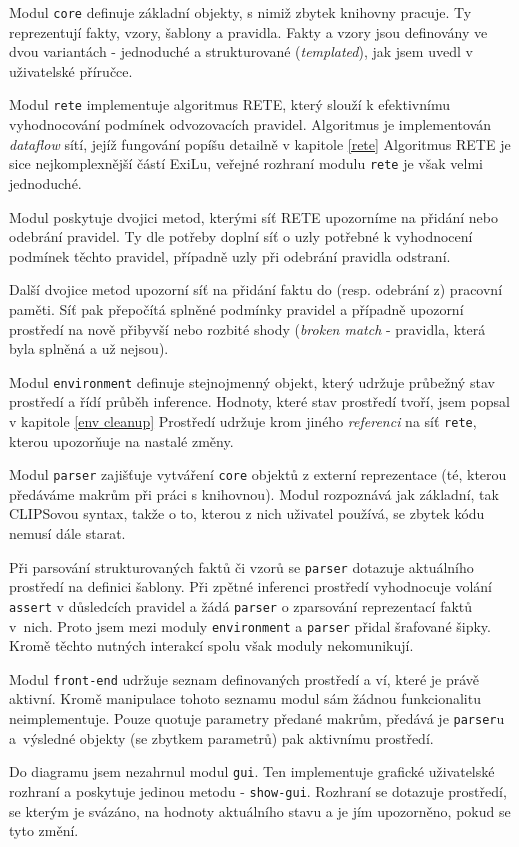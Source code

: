 Modul \verb|core| definuje základní objekty, s nimiž zbytek knihovny
pracuje. Ty reprezentují fakty, vzory, šablony a pravidla. Fakty a vzory jsou
definovány ve dvou variantách - jednoduché a strukturované (\emph{templated}),
jak jsem uvedl v uživatelské příručce.

Modul \verb|rete| implementuje algoritmus RETE, který slouží k efektivnímu
vyhodnocování podmínek odvozovacích pravidel. Algoritmus je implementován
\emph{dataflow} sítí, jejíž fungování popíšu detailně v kapitole \ref{rete}
Algoritmus RETE je sice nejkomplexnější částí ExiLu, veřejné rozhraní modulu
\verb|rete| je však velmi jednoduché.

Modul poskytuje dvojici metod, kterými síť RETE upozorníme na přidání nebo
odebrání pravidel. Ty dle potřeby doplní síť o uzly potřebné k vyhodnocení
podmínek těchto pravidel, případně uzly při odebrání pravidla odstraní.

Další dvojice metod upozorní síť na přidání faktu do (resp. odebrání z) pracovní
paměti. Síť pak přepočítá splněné podmínky pravidel a případně upozorní
prostředí na nově přibyvší nebo rozbité shody (\emph{broken match} - pravidla,
která byla splněná a už nejsou).

Modul \verb|environment| definuje stejnojmenný objekt, který udržuje průbežný
stav prostředí a řídí průběh inference. Hodnoty, které stav prostředí tvoří,
jsem popsal v kapitole \ref{env cleanup} Prostředí udržuje krom jiného
\emph{referenci} na síť \verb|rete|, kterou upozorňuje na nastalé změny.

Modul \verb|parser| zajišťuje vytváření \verb|core| objektů z externí
reprezentace (té, kterou předáváme makrům při práci s knihovnou). Modul
rozpoznává jak základní, tak CLIPSovou syntax, takže o to, kterou z nich
uživatel používá, se zbytek kódu nemusí dále starat.

Při parsování strukturovaných faktů či vzorů se \verb|parser| dotazuje
aktuálního prostředí na definici šablony. Při zpětné inferenci prostředí
vyhodnocuje volání \verb|assert| v důsledcích pravidel a žádá \verb|parser| o
zparsování reprezentací faktů v~nich. Proto jsem mezi moduly \verb|environment|
a \verb|parser| přidal šrafované šipky. Kromě těchto nutných interakcí spolu
však moduly nekomunikují.

Modul \verb|front-end| udržuje seznam definovaných prostředí a ví, které je
právě aktivní. Kromě manipulace tohoto seznamu modul sám žádnou funkcionalitu
neimplementuje. Pouze quotuje parametry předané makrům, předává je
\verb|parser|u a~výsledné objekty (se zbytkem parametrů) pak aktivnímu prostředí.

Do diagramu jsem nezahrnul modul \verb|gui|. Ten implementuje grafické
uživatelské rozhraní a poskytuje jedinou metodu - \verb|show-gui|. Rozhraní se
dotazuje prostředí, se kterým je svázáno, na hodnoty aktuálního stavu a je jím
upozorněno, pokud se tyto změní.
